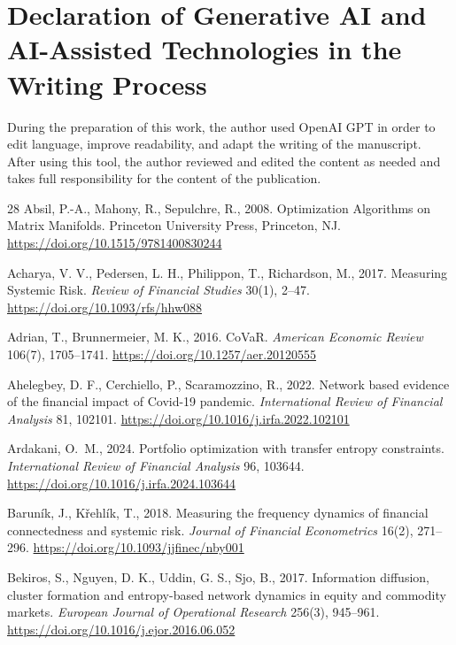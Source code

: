 \documentclass[review,12pt,authoryear]{elsarticle}
\begin{document}
\section*{Declaration of Generative AI and AI-Assisted Technologies in the Writing Process}
During the preparation of this work, the author used OpenAI GPT in order to edit language, improve readability, and adapt the writing of the manuscript. After using this tool, the author reviewed and edited the content as needed and takes full responsibility for the content of the publication.


\begin{thebibliography}{28}
Absil, P.-A., Mahony, R., Sepulchre, R., 2008.
\newblock Optimization Algorithms on Matrix Manifolds.
\newblock Princeton University Press, Princeton, NJ. \url{https://doi.org/10.1515/9781400830244}

Acharya, V. V., Pedersen, L. H., Philippon, T., Richardson, M., 2017.
\newblock Measuring Systemic Risk.
\newblock \emph{Review of Financial Studies} 30(1), 2--47. \url{https://doi.org/10.1093/rfs/hhw088}

Adrian, T., Brunnermeier, M. K., 2016.
\newblock CoVaR.
\newblock \emph{American Economic Review} 106(7), 1705--1741. \url{https://doi.org/10.1257/aer.20120555}

Ahelegbey, D. F., Cerchiello, P., Scaramozzino, R., 2022.
\newblock Network based evidence of the financial impact of Covid-19 pandemic.
\newblock \emph{International Review of Financial Analysis} 81, 102101. \url{https://doi.org/10.1016/j.irfa.2022.102101}

Ardakani, O.~M., 2024.
\newblock Portfolio optimization with transfer entropy constraints.
\newblock \emph{International Review of Financial Analysis} 96, 103644. \url{https://doi.org/10.1016/j.irfa.2024.103644}

Barun{\'i}k, J., K{\v{r}}ehl{\'i}k, T., 2018.
\newblock Measuring the frequency dynamics of financial connectedness and systemic risk.
\newblock \emph{Journal of Financial Econometrics} 16(2), 271--296. \url{https://doi.org/10.1093/jjfinec/nby001}

Bekiros, S., Nguyen, D. K., Uddin, G. S., Sjo, B., 2017.
\newblock Information diffusion, cluster formation and entropy-based network dynamics in equity and commodity markets.
\newblock \emph{European Journal of Operational Research} 256(3), 945--961. \url{https://doi.org/10.1016/j.ejor.2016.06.052}


\end{thebibliography}
\end{document}
